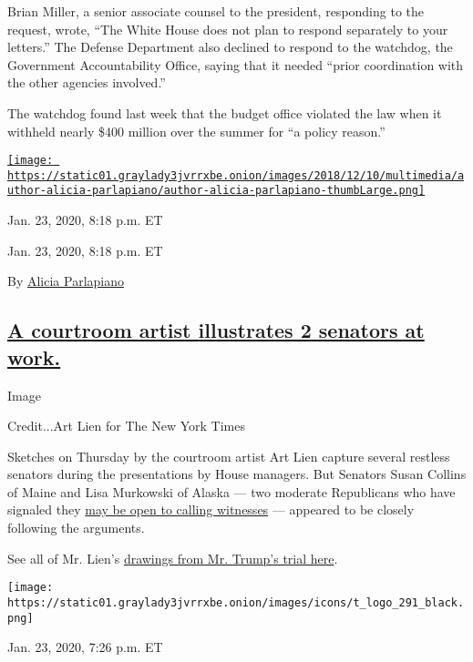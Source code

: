 Brian Miller, a senior associate counsel to the president, responding to
the request, wrote, ``The White House does not plan to respond
separately to your letters.'' The Defense Department also declined to
respond to the watchdog, the Government Accountability Office, saying
that it needed ``prior coordination with the other agencies involved.''

The watchdog found last week that the budget office violated the law
when it withheld nearly \$400 million over the summer for ``a policy
reason.''

\href{https://www.nytimes3xbfgragh.onion/by/alicia-parlapiano}{\texttt{[image: https://static01.graylady3jvrrxbe.onion/images/2018/12/10/multimedia/author-alicia-parlapiano/author-alicia-parlapiano-thumbLarge.png]}}

Jan. 23, 2020, 8:18 p.m. ET

Jan. 23, 2020, 8:18 p.m. ET

By \href{https://www.nytimes3xbfgragh.onion/by/alicia-parlapiano}{Alicia
Parlapiano}

\hypertarget{a-courtroom-artist-illustrates-2-senators-at-work}{%
\subsection{\texorpdfstring{\protect\hyperlink{art-lien-courtroom}{A
courtroom artist illustrates 2 senators at
work.}}{A courtroom artist illustrates 2 senators at work.}}\label{a-courtroom-artist-illustrates-2-senators-at-work}}

Image

Credit...Art Lien for The New York Times

Sketches on Thursday by the courtroom artist Art Lien capture several
restless senators during the presentations by House managers. But
Senators Susan Collins of Maine and Lisa Murkowski of Alaska --- two
moderate Republicans who have signaled they
\href{https://www.nytimes3xbfgragh.onion/2020/01/14/us/politics/republicans-impeachment-witnesses.html}{may
be open to calling witnesses} --- appeared to be closely following the
arguments.

See all of Mr. Lien's
\href{https://www.nytimes3xbfgragh.onion/interactive/2020/01/16/us/politics/senate-impeachment-trial-sketches.html}{drawings
from Mr. Trump's trial here}.

\texttt{[image: https://static01.graylady3jvrrxbe.onion/images/icons/t\_logo\_291\_black.png]}

Jan. 23, 2020, 7:26 p.m. ET

